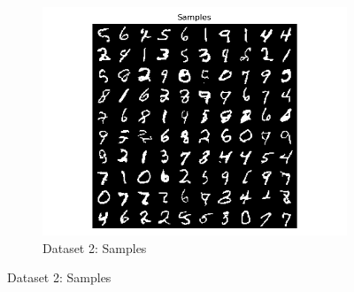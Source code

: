 \documentclass{article}
\begin{document}
\begin{enumerate}[(a)]
\begin{figure}[H]
    \begin{subfigure}{0.45\textwidth}
        \centering
        \includegraphics[width=\textwidth]{figures/q3_a_dset2_samples.png}
        \caption{Dataset 2: Samples}
    \end{subfigure}
\end{figure}

\newpage


\end{enumerate}
\end{document}
